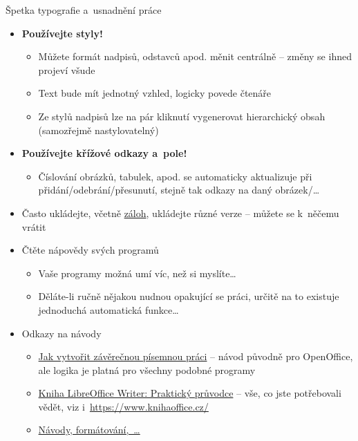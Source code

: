 \documentclass[compress, ucs, xelatex, 11pt, xcolor=svgnames, aspectratio=169,
	hyperref={
		bookmarks=true,
		unicode=true,
		colorlinks=true,
		pdftitle={Citacni software},
		plainpages=false,
		pdfauthor={Vojtech Zeisek},
		pdfsubject={Kratky uvod do citacniho software},
		pdfcreator={XeLaTeX},
		pdfkeywords={citace, reference, software, literatura},
		linkcolor=Crimson, %
		anchorcolor=Magenta, %
		citecolor=Magenta, %
		filecolor=Magenta, %
		menucolor=Magenta, %
		urlcolor=DarkTurquoise, %
		pdftex},
	url={hyphens, lowtilde} %
	]{beamer}
\begin{document}
\begin{frame}[allowframebreaks]{Špetka typografie a~usnadnění práce}
	\begin{itemize}
		\item \textbf{Používejte styly!}
			\begin{itemize}
				\item Můžete formát nadpisů, odstavců apod. měnit centrálně -- změny se ihned projeví všude
				\item Text bude mít jednotný vzhled, logicky povede čtenáře
				\item Ze stylů nadpisů lze na pár kliknutí vygenerovat hierarchický obsah (samozřejmě nastylovatelný)
			\end{itemize}
		\item \textbf{Používejte křížové odkazy a~pole!}
			\begin{itemize}
				\item Číslování obrázků, tabulek, apod. se automaticky aktualizuje při přidání/odebrání/přesunutí, stejně tak odkazy na daný obrázek/\ldots
			\end{itemize}
		\item Často ukládejte, včetně \href{https://www.natur.cuni.cz/biologie/botanika/provozni-informace/servery-weby-a-pocitace/moznosti-zalohovani-dat}{záloh}, ukládejte různé verze -- můžete se k~něčemu vrátit
		\item Čtěte nápovědy svých programů
			\begin{itemize}
				\item Vaše programy možná umí víc, než si myslíte\ldots
				\item Děláte-li ručně nějakou nudnou opakující se práci, určitě na to existuje jednoduchá automatická funkce\ldots
			\end{itemize}
		\item Odkazy na návody
			\begin{itemize}
				\item \href{https://www.linuxexpres.cz/kancelar/jak-vytvorit-zaverecnou-pisemnou-praci}{Jak vytvořit závěrečnou písemnou práci} -- návod původně pro OpenOffice, ale logika je platná pro všechny podobné programy
				\item \href{https://www.root.cz/knihy/libreoffice-writer-prakticky-pruvodce/}{Kniha LibreOffice Writer: Praktický průvodce} -- vše, co jste potřebovali vědět, viz i~\url{https://www.knihaoffice.cz/}
				\item \href{https://formatovani-dokumentu.cz/navody}{Návody, formátování,~\ldots}
			\end{itemize}

\end{itemize}
\end{frame}
\end{document}
